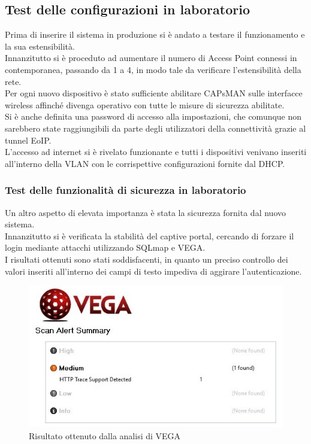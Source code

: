 \documentclass[Realizzazione.tex]{subfiles}
\begin{document}
\subsection{Test delle configurazioni in laboratorio} 
Prima di inserire il sistema in produzione si è andato a testare il funzionamento e la sua estensibilità. \\
Innanzitutto si è proceduto ad aumentare il numero di Access Point connessi in contemporanea, passando da 1 a 4, in modo tale da verificare l'estensibilità della rete. \\
Per ogni nuovo dispositivo è stato sufficiente abilitare CAPsMAN sulle interfacce wireless affinché divenga operativo con tutte le misure di sicurezza abilitate. \\
Si è anche definita una password di accesso alla impostazioni, che comunque non sarebbero state raggiungibili da parte degli utilizzatori della connettività grazie al tunnel EoIP. \\
L'accesso ad internet si è rivelato funzionante e tutti i dispositivi venivano inseriti all'interno della  VLAN con le corrispettive configurazioni fornite dal DHCP.

\subsubsection{Test delle funzionalità di sicurezza in laboratorio} 
Un altro aspetto di elevata importanza è stata la sicurezza fornita dal nuovo sistema. \\
Innanzitutto si è verificata la stabilità del captive portal, cercando di forzare il login mediante attacchi  utilizzando SQLmap e VEGA. \\
I risultati ottenuti sono stati soddisfacenti, in quanto un preciso controllo dei valori inseriti all'interno dei campi di testo impediva di aggirare l'autenticazione.
\begin{figure}[H]
	\centering
	\includegraphics[width=0.9\linewidth]{"images/vega"}
	\caption{Risultato ottenuto dalla analisi di VEGA}
	\label{fig:Risultato ottenuto dalla analisi di VEGA}
\end{figure}
\end{document}
